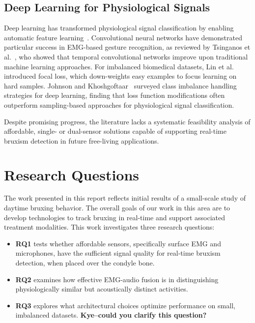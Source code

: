 \documentclass[acmtog, nonacm]{acmart}
\begin{document}
\subsection{Deep Learning for Physiological Signals}

Deep learning has transformed physiological signal classification by enabling automatic feature learning~\cite{faust2018deep}. Convolutional neural networks have demonstrated particular success in EMG-based gesture recognition, as reviewed by Tsinganos et al.~\cite{tsinganos2019improved}, who showed that temporal convolutional networks improve upon traditional machine learning approaches. For imbalanced biomedical datasets, Lin et al.~\cite{lin2017focal} introduced focal loss, which down-weights easy examples to focus learning on hard samples. Johnson and Khoshgoftaar~\cite{johnson2019survey} surveyed class imbalance handling strategies for deep learning, finding that loss function modifications often outperform sampling-based approaches for physiological signal classification.

Despite promising progress, the literature lacks a systematic feasibility analysis of affordable, single- or dual-sensor solutions capable of supporting real-time bruxism detection in future free-living applications.


\section{Research Questions}

The work presented in this report reflects initial results of a small-scale study of daytime bruxing behavior. The overall goals of our work in this area are to develop technologies to track bruxing in real-time and support associated treatment modalities. This work investigates three research questions:

\begin{itemize}
    \item \textbf{RQ1} tests whether affordable sensors, specifically surface EMG and microphones, have the sufficient signal quality for real-time bruxism detection, when placed over the condyle bone.
    \item \textbf{RQ2} examines how effective EMG-audio fusion is in distinguishing physiologically similar but acoustically distinct activities.
    \item \textbf{RQ3} explores what architectural choices optimize performance on small, imbalanced datasets.  \textbf{Kye--could you clarify this question?}
\end{itemize}
\end{document}
